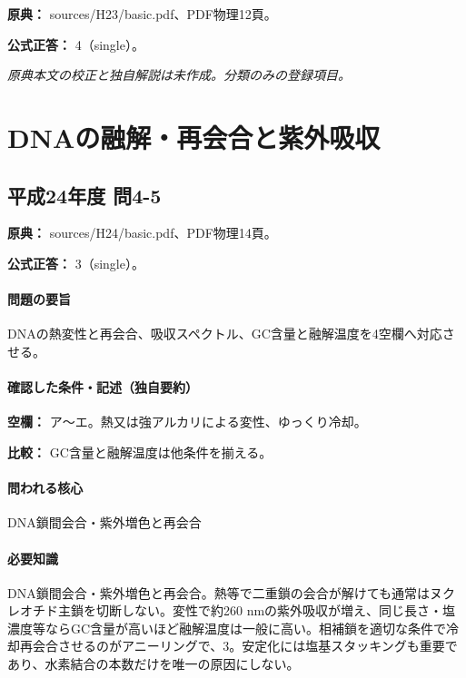 \noindent\textbf{原典：} sources/H23/basic.pdf、PDF物理12頁。

\textbf{公式正答：} 4（single）。

\par\textit{原典本文の校正と独自解説は未作成。分類のみの登録項目。}

\section{DNAの融解・再会合と紫外吸収}

\subsection{平成24年度 問4-5}
\label{q:h24-reg-basic-4-5}

\noindent\textbf{原典：} sources/H24/basic.pdf、PDF物理14頁。

\textbf{公式正答：} 3（single）。

\paragraph{問題の要旨} DNAの熱変性と再会合、吸収スペクトル、GC含量と融解温度を4空欄へ対応させる。

\paragraph{確認した条件・記述（独自要約）}\mbox{}\par

\noindent\textbf{空欄：} ア〜エ。熱又は強アルカリによる変性、ゆっくり冷却。\par

\noindent\textbf{比較：} GC含量と融解温度は他条件を揃える。\par

\paragraph{問われる核心} DNA鎖間会合・紫外増色と再会合

\paragraph{必要知識} DNA鎖間会合・紫外増色と再会合。熱等で二重鎖の会合が解けても通常はヌクレオチド主鎖を切断しない。変性で約260 nmの紫外吸収が増え、同じ長さ・塩濃度等ならGC含量が高いほど融解温度は一般に高い。相補鎖を適切な条件で冷却再会合させるのがアニーリングで、3。安定化には塩基スタッキングも重要であり、水素結合の本数だけを唯一の原因にしない。

